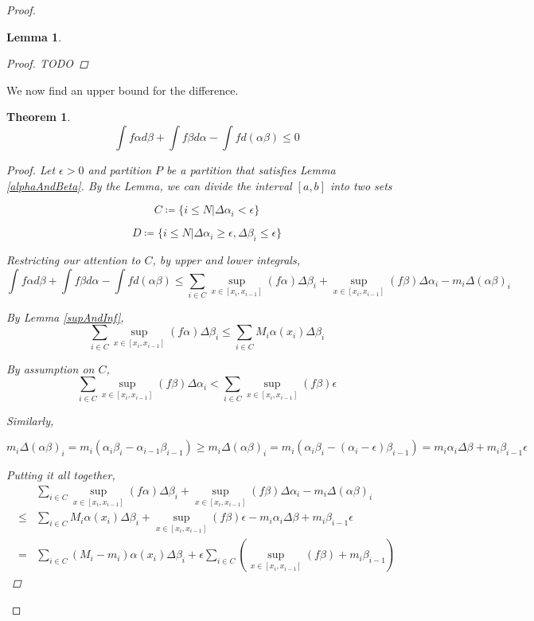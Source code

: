 \documentclass{amsart}
\newtheorem{theorem}{Theorem}[subsection]
\newtheorem{lemma}{Lemma}[subsubsection]
\begin{document}
\begin{proof}
\begin{lemma}
\begin{proof}
TODO
\end{proof}
\end{lemma}

We now find an upper bound for the difference.

\begin{theorem}
\[
\int f\alpha d\beta + \int f\beta d\alpha - \int f d(\alpha\beta) \leq 0
\]

\begin{proof}
Let $\epsilon > 0$ and partition $P$ be a partition that satisfies Lemma \ref{alphaAndBeta}. By the Lemma, we can divide the interval $[a, b]$ into two sets

\[C \coloneqq \{i \leq N | \Delta\alpha_i < \epsilon \} \]

\[D \coloneqq \{i \leq N | \Delta\alpha_i \geq \epsilon, \Delta\beta_i \leq \epsilon \} \]

Restricting our attention to $C$, by upper and lower integrals,
\[
\int f\alpha d\beta + \int f\beta d\alpha - \int f d(\alpha\beta) 
\leq
\sum_{i \in C} \sup_{x \in[x_i, x_{i-1}]} (f\alpha) \Delta\beta_i
+ \sup_{x \in[x_i, x_{i-1}]} (f\beta) \Delta\alpha_i
- m_i \Delta(\alpha\beta)_i
\]

By Lemma \ref{supAndInf}, 
\[
\sum_{i \in C} \sup_{x \in[x_i, x_{i-1}]} (f\alpha) \Delta\beta_i
\leq
\sum_{i \in C} M_i \alpha(x_i) \Delta\beta_i
\]


By assumption on $C$, 
\[
\sum_{i \in C} \sup_{x \in[x_i, x_{i-1}]} (f\beta) \Delta\alpha_i < \sum_{i \in C} \sup_{x \in[x_i, x_{i-1}]} (f\beta) \epsilon
\]

Similarly,

\[
m_i \Delta(\alpha\beta)_i = m_i (\alpha_i \beta_i - \alpha_{i-1} \beta_{i-1})
\geq m_i \Delta(\alpha\beta)_i = m_i (\alpha_i \beta_i - (\alpha_{i} - \epsilon) \beta_{i-1})
= m_i \alpha_i \Delta\beta + m_i \beta_{i-1} \epsilon
\]

Putting it all together,
\begin{align*}
&\sum_{i \in C} \sup_{x \in[x_i, x_{i-1}]} (f\alpha) \Delta\beta_i
+ \sup_{x \in[x_i, x_{i-1}]} (f\beta) \Delta\alpha_i
- m_i \Delta(\alpha\beta)_i \\
\leq
&\sum_{i \in C} M_i \alpha(x_i) \Delta\beta_i
+ \sup_{x \in[x_i, x_{i-1}]} (f\beta) \epsilon
- m_i \alpha_i \Delta\beta + m_i \beta_{i-1} \epsilon \\
=
&\sum_{i \in C} (M_i - m_i) \alpha(x_i) \Delta\beta_i
+ \epsilon \sum_{i \in C} (\sup_{x \in[x_i, x_{i-1}]} (f\beta) + m_i \beta_{i-1})
\end{align*}

\end{proof}
\end{theorem}

\end{proof}
\end{document}

